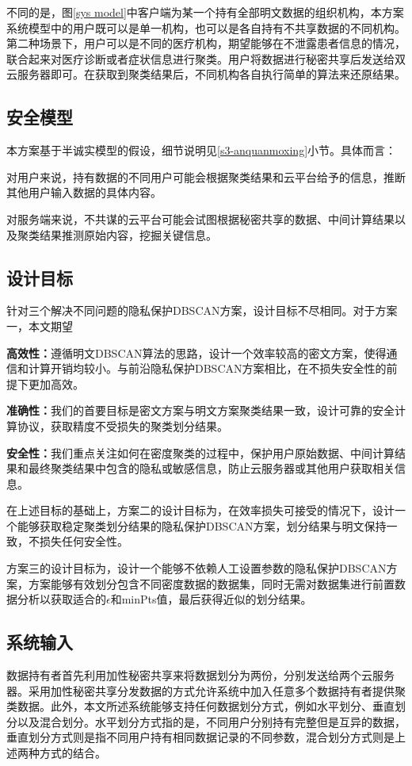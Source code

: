 不同的是，图\ref{sys model}中客户端为某一个持有全部明文数据的组织机构，本方案系统模型中的用户既可以是单一机构，也可以是各自持有不共享数据的不同机构。第二种场景下，用户可以是不同的医疗机构，期望能够在不泄露患者信息的情况，联合起来对医疗诊断或者症状信息进行聚类。用户将数据进行秘密共享后发送给双云服务器即可。在获取到聚类结果后，不同机构各自执行简单的算法来还原结果。


\subsection{安全模型}
本方案基于半诚实模型的假设，细节说明见\ref{s3-anquanmoxing}小节。具体而言：

对用户来说，持有数据的不同用户可能会根据聚类结果和云平台给予的信息，推断其他用户输入数据的具体内容。

对服务端来说，不共谋的云平台可能会试图根据秘密共享的数据、中间计算结果以及聚类结果推测原始内容，挖掘关键信息。
\subsection{设计目标}
针对三个解决不同问题的隐私保护DBSCAN方案，设计目标不尽相同。对于方案一，本文期望
\begin{compactitem}
	\item\textbf{高效性：}遵循明文DBSCAN算法的思路，设计一个效率较高的密文方案，使得通信和计算开销均较小。与前沿隐私保护DBSCAN方案相比，在不损失安全性的前提下更加高效。
	\item\textbf{准确性：}我们的首要目标是密文方案与明文方案聚类结果一致，设计可靠的安全计算协议，获取精度不受损失的聚类划分结果。
	\item\textbf{安全性：}我们重点关注如何在密度聚类的过程中，保护用户原始数据、中间计算结果和最终聚类结果中包含的隐私或敏感信息，防止云服务器或其他用户获取相关信息。
\end{compactitem}

在上述目标的基础上，方案二的设计目标为，在效率损失可接受的情况下，设计一个能够获取稳定聚类划分结果的隐私保护DBSCAN方案，划分结果与明文保持一致，不损失任何安全性。

方案三的设计目标为，设计一个能够不依赖人工设置参数的隐私保护DBSCAN方案，方案能够有效划分包含不同密度数据的数据集，同时无需对数据集进行前置数据分析以获取适合的$\epsilon$和minPts值，最后获得近似的划分结果。

\subsection{系统输入}
数据持有者首先利用加性秘密共享来将数据划分为两份，分别发送给两个云服务器。采用加性秘密共享分发数据的方式允许系统中加入任意多个数据持有者提供聚类数据。此外，本文所述系统能够支持任何数据划分方式，例如水平划分、垂直划分以及混合划分。水平划分方式指的是，不同用户分别持有完整但是互异的数据\cite{gheid2016efficient}，垂直划分方式则是指不同用户持有相同数据记录的不同参数\cite{doganay2008distributed}，混合划分方式则是上述两种方式的结合\cite{yu2010multi}。
